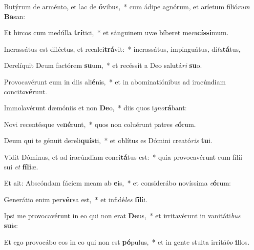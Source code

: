 \item Butýrum de arménto, et lac de \textbf{ó}vibus,~* cum ádipe agnórum, et aríetum filió\textit{rum} \textbf{Ba}san:
\item Et hircos cum medúlla \textbf{trí}tici,~* et sánguinem uvæ bíberet me\textit{ra}\textbf{cís}\textbf{si}mum.
\item Incrassátus est diléctus, et recalci\textbf{trá}vit:~* incrassátus, impinguátus, di\textit{la}\textbf{tá}tus,
\item Derelíquit Deum factórem \textbf{su}um,~* et recéssit a Deo salutá\textit{ri} \textbf{su}o.
\item Provocavérunt eum in diis ali\textbf{é}nis,~* et in abominatiónibus ad iracúndiam conci\textit{ta}\textbf{vé}runt.
\item Immolavérunt dæmóniis et non \textbf{De}o,~* diis quos i\textit{gno}\textbf{rá}bant:
\item Novi recentésque ve\textbf{né}runt,~* quos non coluérunt patres \textit{e}\textbf{ó}rum.
\item Deum qui te génuit dereli\textbf{quís}ti,~* et oblítus es Dómini creató\textit{ris} \textbf{tu}i.
\item Vidit Dóminus, et ad iracúndiam conci\textbf{tá}tus est:~* quia provocavérunt eum fílii sui \textit{et} \textbf{fí}\textbf{li}æ.
\item Et ait: Abscóndam fáciem meam ab \textbf{e}is,~* et considerábo novíssima \textit{e}\textbf{ó}rum:
\item Generátio enim per\textbf{vér}sa est,~* et infidé\textit{les} \textbf{fí}\textbf{li}i.
\item Ipsi me provocavérunt in eo qui non erat \textbf{De}us,~* et irritavérunt in vanitáti\textit{bus} \textbf{su}is:
\item Et ego provocábo eos in eo qui non est \textbf{pó}pulus,~* et in gente stulta irritá\textit{bo} \textbf{il}los.
